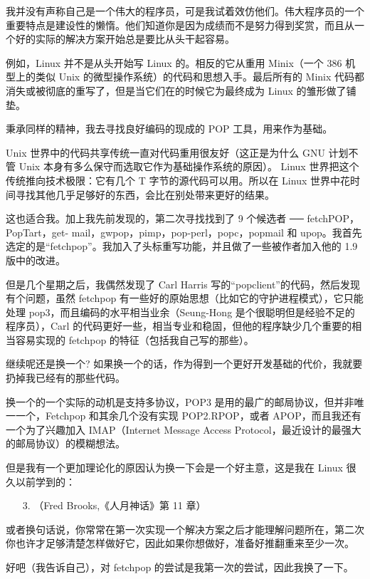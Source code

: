 我并没有声称自己是一个伟大的程序员，可是我试着效仿他们。伟大程序员的一个重要特点是建设性的懒惰。他们知道你是因为成绩而不是努力得到奖赏，而且从一个好的实际的解决方案开始总是要比从头干起容易。


例如，Linux 并不是从头开始写 Linux 的。相反的它从重用 Minix（一个 386 机型上的类似 Unix 的微型操作系统）的代码和思想入手。最后所有的 Minix 代码都消失或被彻底的重写了，但是当它们在的时候它为最终成为 Linux 的雏形做了铺垫。


秉承同样的精神，我去寻找良好编码的现成的 POP 工具，用来作为基础。


Unix 世界中的代码共享传统一直对代码重用很友好（这正是为什么 GNU 计划不管 Unix 本身有多么保守而选取它作为基础操作系统的原因）。 Linux 世界把这个传统推向技术极限：它有几个 T 字节的源代码可以用。所以在 Linux 世界中花时间寻找其他几乎足够好的东西，会比在别处带来更好的结果。


这也适合我。加上我先前发现的，第二次寻找找到了 9 个候选者 ── fetchPOP，PopTart，get- mail，gwpop，pimp，pop-perl，popc，popmail 和 upop。我首先选定的是“fetchpop”。我加入了头标重写功能，并且做了一些被作者加入他的 1.9 版中的改进。


但是几个星期之后，我偶然发现了 Carl Harris 写的“popclient”的代码，然后发现有个问题，虽然 fetchpop 有一些好的原始思想（比如它的守护进程模式），它只能处理 pop3，而且编码的水平相当业余（Seung-Hong 是个很聪明但是经验不足的程序员），Carl 的代码更好一些，相当专业和稳固，但他的程序缺少几个重要的相当容易实现的 fetchpop 的特征（包括我自己写的那些）。


继续呢还是换一个? 如果换一个的话，作为得到一个更好开发基础的代价，我就要扔掉我已经有的那些代码。


换一个的一个实际的动机是支持多协议，POP3 是用的最广的邮局协议，但并非唯一一个，Fetchpop 和其余几个没有实现 POP2.RPOP，或者 APOP，而且我还有一个为了兴趣加入 IMAP（Internet Message Access Protocol，最近设计的最强大的邮局协议）的模糊想法。


但是我有一个更加理论化的原因认为换一下会是一个好主意，这是我在 Linux 很久以前学到的：

\begin{enumerate}
\item[3.] （Fred Brooks,《人月神话》第 11 章）
\end{enumerate}

或者换句话说，你常常在第一次实现一个解决方案之后才能理解问题所在，第二次你也许才足够清楚怎样做好它，因此如果你想做好，准备好推翻重来至少一次。


好吧（我告诉自己），对 fetchpop 的尝试是我第一次的尝试，因此我换了一下。


